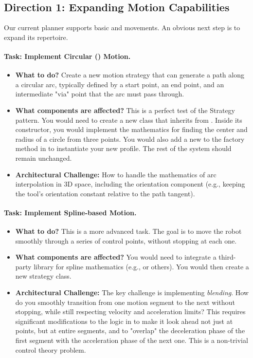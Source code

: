 \subsection{Direction 1: Expanding Motion Capabilities}
\label{subsec:dev_path_motion}
Our current planner supports basic  and  movements. An obvious next step is to expand its repertoire.

\paragraph{Task: Implement Circular () Motion.}
\begin{itemize}
    \item \textbf{What to do?} Create a new motion strategy that can generate a path along a circular arc, typically defined by a start point, an end point, and an intermediate "via" point that the arc must pass through.
    \item \textbf{What components are affected?} This is a perfect test of the Strategy pattern. You would need to create a new  class that inherits from . Inside its constructor, you would implement the mathematics for finding the center and radius of a circle from three points. You would also add a new  to the factory method in  to instantiate your new profile. The rest of the system should remain unchanged.
    \item \textbf{Architectural Challenge:} How to handle the mathematics of arc interpolation in 3D space, including the orientation component (e.g., keeping the tool's orientation constant relative to the path tangent).
\end{itemize}

\paragraph{Task: Implement Spline-based Motion.}
\begin{itemize}
    \item \textbf{What to do?} This is a more advanced task. The goal is to move the robot smoothly through a series of control points, without stopping at each one.
    \item \textbf{What components are affected?} You would need to integrate a third-party library for spline mathematics (e.g.,  or others). You would then create a new  strategy class.
    \item \textbf{Architectural Challenge:} The key challenge is implementing \textit{blending}. How do you smoothly transition from one motion segment to the next without stopping, while still respecting velocity and acceleration limits? This requires significant modifications to the logic in  to make it look ahead not just at points, but at entire segments, and to "overlap" the deceleration phase of the first segment with the acceleration phase of the next one. This is a non-trivial control theory problem.
\end{itemize}

